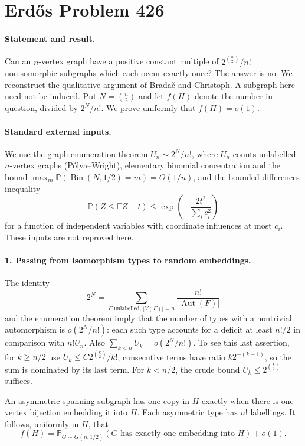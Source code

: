 \section*{Erd\H{o}s Problem 426}

\paragraph{Statement and result.}
Can an \(n\)-vertex graph have a positive constant multiple of
\(2^{\binom n2}/n!\) nonisomorphic subgraphs which each occur exactly
once? The answer is no. We reconstruct the qualitative argument of
Brada\v{c} and Christoph. A subgraph here need not be induced.
Put \(N=\binom n2\) and let \(f(H)\) denote the number in question,
divided by \(2^N/n!\). We prove uniformly that \(f(H)=o(1)\).

\paragraph{Standard external inputs.}
We use the graph-enumeration theorem \(U_n\sim2^N/n!\), where \(U_n\)
counts unlabelled \(n\)-vertex graphs (P\'olya--Wright), elementary
binomial concentration and the bound
\(\max_m\mathbb P(\operatorname{Bin}(N,1/2)=m)=O(1/n)\),
and the bounded-differences inequality
\[
 \mathbb P(Z\leq\mathbb EZ-t)
 \leq\exp\left(-\frac{2t^2}{\sum_i c_i^2}\right)
 \tag{1}
\]
for a function of independent variables with coordinate influences
at most \(c_i\). These inputs are not reproved here.

\paragraph{1. Passing from isomorphism types to random embeddings.}
The identity
\[
 2^N=\sum_{F\text{ unlabelled},\,|V(F)|=n}
       \frac{n!}{|\operatorname{Aut}(F)|}
\]
and the enumeration theorem imply that the number of types with a
nontrivial automorphism is \(o(2^N/n!)\): each such type accounts for
a deficit at least \(n!/2\) in comparison with \(n!U_n\).
Also \(\sum_{k<n}U_k=o(2^N/n!)\). To see this last assertion, for
\(k\geq n/2\) use \(U_k\leq C2^{\binom k2}/k!\); consecutive terms
have ratio \(k2^{-(k-1)}\), so the sum is dominated by its last term.
For \(k<n/2\), the crude bound \(U_k\leq2^{\binom k2}\) suffices.

An asymmetric spanning subgraph has one copy in \(H\) exactly when
there is one vertex bijection embedding it into \(H\). Each asymmetric
type has \(n!\) labellings. It follows, uniformly in \(H\), that
\[
 f(H)=\mathbb P_{G\sim G(n,1/2)}
       (G\text{ has exactly one embedding into }H)+o(1).
 \tag{2}
\]

